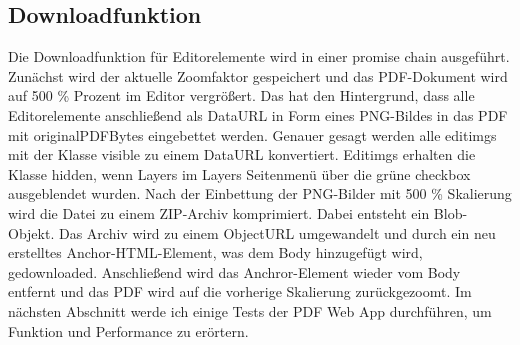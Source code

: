 \subsection{Downloadfunktion}
Die Downloadfunktion für Editorelemente wird in einer promise chain ausgeführt. Zunächst wird der aktuelle Zoomfaktor gespeichert und das PDF-Dokument wird auf 500 \% Prozent im Editor vergrößert. Das hat den Hintergrund, dass alle Editorelemente anschließend als DataURL in Form eines PNG-Bildes in das PDF mit originalPDFBytes eingebettet werden. Genauer gesagt werden alle editimgs mit der Klasse visible zu einem DataURL konvertiert. Editimgs erhalten die Klasse hidden, wenn Layers im Layers Seitenmenü über die grüne checkbox ausgeblendet wurden. Nach der Einbettung der PNG-Bilder mit 500 \% Skalierung wird die Datei zu einem ZIP-Archiv komprimiert. Dabei entsteht ein Blob-Objekt. Das Archiv wird zu einem ObjectURL umgewandelt und durch ein neu erstelltes Anchor-HTML-Element, was dem Body hinzugefügt wird, gedownloaded. Anschließend wird das Anchror-Element wieder vom Body entfernt und das PDF wird auf die vorherige Skalierung zurückgezoomt. Im nächsten Abschnitt werde ich einige Tests der PDF Web App durchführen, um Funktion und Performance zu erörtern. 